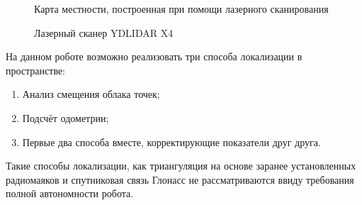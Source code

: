 \documentclass[12pt,a4paper]{scrartcl}
\begin{document}
			\begin{figure}[h]
				\caption{Карта местности, построенная при помощи лазерного сканирования}
				\label{fig:Map}
			\end{figure}
			
			\begin{figure}[h]
				\caption{Лазерный сканер YDLIDAR X4}
				\label{fig:X4}
			\end{figure}
			
			На данном роботе возможно реализовать три способа локализации в пространстве:
			\begin{enumerate}
				\item Анализ смещения облака точек;
				\item Подсчёт одометрии;
				\item Первые два способа вместе, корректирующие показатели друг друга.
			\end{enumerate}
			
			Такие способы локализации, как триангуляция на основе заранее установленных радиомаяков и спутниковая связь Глонасс не рассматриваются ввиду требования полной автономности робота.
			
\end{document}
